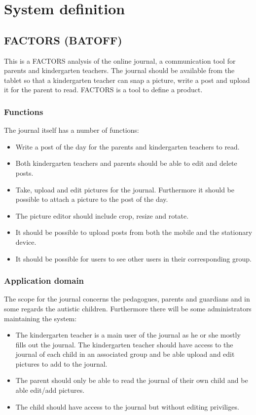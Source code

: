 \chapter{System definition}

\section{FACTORS (BATOFF)}
This is a FACTORS analysis of the online journal, a communication tool for parents and kindergarten teachers. The journal should be available from the tablet so that a kindergarten teacher can snap a picture, write a post and upload it for the parent to read. FACTORS is a tool to define a product.

\subsection{Functions}
The journal itself has a number of functions:
\begin{itemize}
	\item{Write a post of the day for the parents and kindergarten teachers to read.}
	\item{Both kindergarten teachers and parents should be able to edit and delete posts.}
	\item{Take, upload and edit pictures for the journal. Furthermore it should be possible to attach a picture to the post of the day.}
	\item{The picture editor should include crop, resize and rotate.}
	\item{It should be possible to upload posts from both the mobile and the stationary device.}
	\item{It should be possible for users to see other users in their corresponding group.}
\end{itemize}

\subsection{Application domain}
The scope for the journal concerns the pedagogues, parents and guardians and in some regards the autistic children. Furthermore there will be some administrators maintaining the system:
\begin{itemize}
	\item{The kindergarten teacher is a main user of the journal as he or she mostly fills out the journal. The kindergarten teacher should have access to the journal of each child in an associated group and be able upload and edit pictures to add to the journal.}
	\item{The parent should only be able to read the journal of their own child and be able edit/add pictures.}
	\item{The child should have access to the journal but without editing priviliges.}
\end{itemize}


